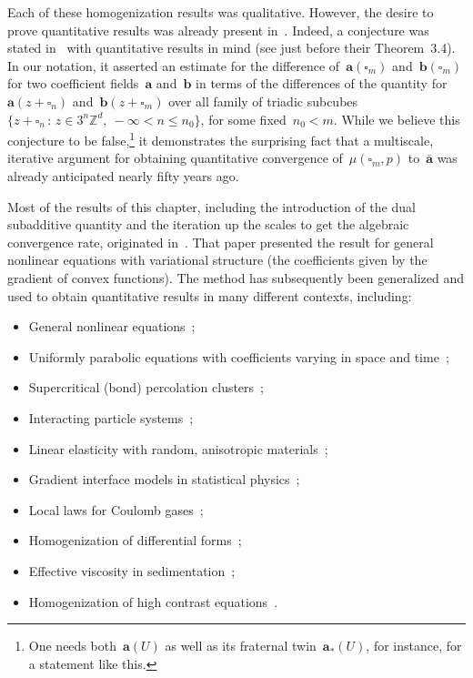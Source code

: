 \documentclass[11pt,twoside]{article} %
\let\oldsquare\square %
\renewcommand{\square}{\oldsquare}
\numberwithin{equation}{section}
\theoremstyle{definition}
\newcommand*{\Zd}{\ensuremath{\mathbb{Z}^d}}
\renewcommand{\b}{\ensuremath{\mathbf{b}}}
\renewcommand{\a}{\mathbf{a}}
\newcommand{\ahom}{\bar{\a}}
\newcommand{\cu}{\square}
\begin{document}
Each of these homogenization results was qualitative. However, the desire to prove quantitative results was already present in~\cite{DGS}. Indeed, a conjecture was stated in~\cite{DGS} with quantitative results in mind (see just before their Theorem~3.4). In our notation, it asserted an estimate for the difference of~$\a(\cu_m)$ and~$\b(\cu_m)$ for two coefficient fields~$\a$ and~$\b$ in terms of the differences of the quantity for~$\a(z+\cu_n)$ and~$\b(z+\cu_m)$ over all family of triadic subcubes~$\{ z+ \cu_n\,:\, z\in 3^n\Zd, \ -\infty < n \leq n_0\}$, for some fixed~$n_0 < m$. 
While we believe this conjecture to be false,\footnote{One needs both~$\a(U)$ as well as its fraternal twin~$\a_*(U)$, for instance, for a statement like this.} it demonstrates the surprising fact that a multiscale, iterative argument for obtaining quantitative convergence of~$\mu(\cu_m,p)$ to~$\ahom$ was already anticipated nearly fifty years ago. 

\smallskip

Most of the results of this chapter, including the introduction of the dual subadditive quantity and the iteration up the scales to get the algebraic convergence rate, originated in~\cite{AS}. That paper presented the result for general nonlinear equations with variational structure (the coefficients given by the gradient of convex functions). The method has subsequently been generalized and used to obtain quantitative results in many different contexts, including: 
\begin{itemize}
\item General nonlinear equations~\cite{AM};

\item Uniformly parabolic equations with coefficients varying in space and time~\cite{ABM}; 

\item Supercritical (bond) percolation clusters~\cite{AD1}; 

\item Interacting particle systems~\cite{GGM,GGMN,FGW};


\item Linear elasticity with random, anisotropic materials~\cite{SZ1};

\item Gradient interface models in statistical physics~\cite{D1,AW,DW,AD2};

\item Local laws for Coulomb gases~\cite{ArmSer};

\item Homogenization of differential forms~\cite{D3};

\item Effective viscosity in sedimentation~\cite{DG0};

\item Homogenization of high contrast equations~\cite{AK.HC,ABK.SD}.

\end{itemize}
\end{document}
